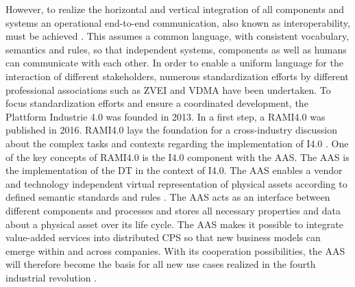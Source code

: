 However, to realize the horizontal and vertical integration of all components and systems an operational end-to-end communication, also known as interoperability, must be achieved \cite[p. 858]{Uslander2015ReferenceApproach}. This assumes a common language, with consistent vocabulary, semantics and rules, so that independent systems, components as well as humans can communicate with each other. In order to enable a uniform language for the interaction of different stakeholders, numerous standardization efforts by different professional associations such as \ac{ZVEI} and \ac{VDMA} have been undertaken. To focus standardization efforts and ensure a coordinated development, the Plattform Industrie 4.0 was founded in 2013. In a first step, a \ac{RAMI4.0} was published in 2016. \ac{RAMI4.0} lays the foundation for a cross-industry discussion about the complex tasks and contexts regarding the implementation of \ac{I4.0} \cite[p. 4]{Heidel2017ReferenzarchitekturmodellIndustrie4.0Komponente}. One of the key concepts of \ac{RAMI4.0} is the \ac{I4.0} component with the \ac{AAS}. The \ac{AAS} is the implementation of the \ac{DT} in the context of \ac{I4.0}. The \ac{AAS} enables a vendor and technology independent virtual representation of physical assets according to defined semantic standards and rules \cite[p. 5]{Wagner2017ThePlant}. The \ac{AAS} acts as an interface between different components and processes and stores all necessary properties and data about a physical asset over its life cycle. The \ac{AAS} makes it possible to integrate value-added services into distributed \ac{CPS} so that new business models can emerge within and across companies. With its cooperation possibilities, the \ac{AAS} will therefore become the basis for all new use cases realized in the fourth industrial revolution \cite[p. 67]{Heidel2017ReferenzarchitekturmodellIndustrie4.0Komponente}.    

